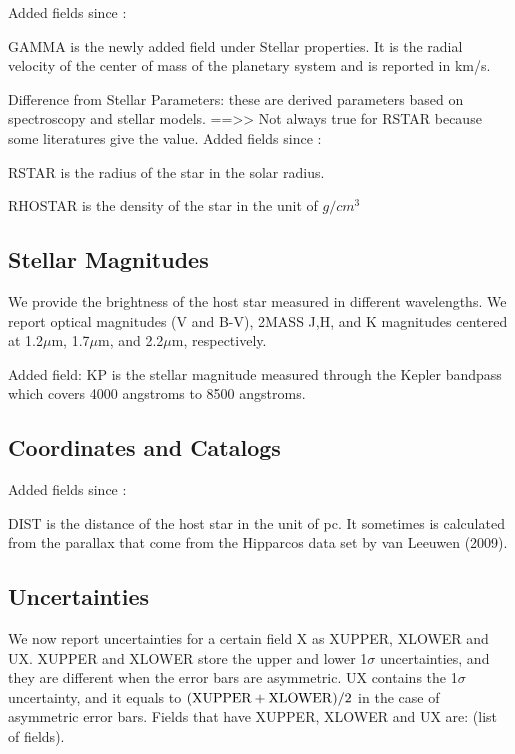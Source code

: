 \documentclass[11pt,preprint]{aastex}
\def\micron{$\mu$m}
\def\micron{$\mu$m}
\begin{document}
\begin{CJK*}{UTF8}{gbsn}
Added fields since \cite{Wright2011}:


GAMMA is the newly added field under Stellar properties. It is the radial velocity of the center of mass of the planetary system and is reported in km/s.  


Difference from Stellar Parameters: these are derived parameters based
on spectroscopy and stellar models. 
==>> Not always true for RSTAR because some literatures give the value. 
Added fields since \cite{Wright2011}:

RSTAR is the radius of the star in the solar radius. 

RHOSTAR is the density of the star in the unit of $g/cm^3$

\subsection {Stellar Magnitudes}

We provide the brightness of the host star measured in different wavelengths. We report optical magnitudes (V and B-V), 2MASS J,H, and K magnitudes centered at 1.2\micron, 1.7\micron, and 2.2\micron, respectively. 

Added field: 
KP is the stellar magnitude measured through the Kepler bandpass which covers 4000 angstroms to 8500 angstroms. 

\subsection{Coordinates and Catalogs}

Added fields since \cite{Wright2011}:

DIST is the distance of the host star in the unit of pc. It sometimes is calculated from the parallax that come from the Hipparcos data set by van Leeuwen (2009).


\subsection{Uncertainties}

We now report uncertainties for a certain field X as XUPPER, XLOWER
and UX. XUPPER and XLOWER store the upper and lower 1$\sigma$
uncertainties, and they are different when the error bars are
asymmetric. UX contains the 1$\sigma$ uncertainty, and it
equals to $({\rm XUPPER+XLOWER})/2$ in the case of asymmetric error
bars. Fields that have XUPPER, XLOWER and UX are: (list of fields).


\end{CJK*}
\end{document}
